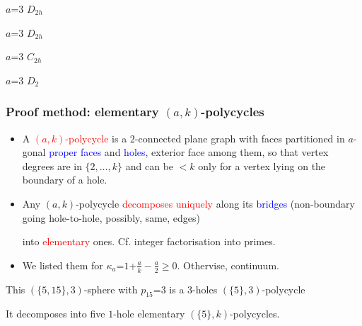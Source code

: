 \documentclass{beamer}
\begin{document}
\begin{frame}
\begin{center}
\begin{minipage}[b]{17mm}
\centering
{}\par
$a$=$3$ $D_{2h}$
\end{minipage}
\begin{minipage}[b]{17mm}
\centering
{}\par
$a$=$3$ $D_{2h}$
\end{minipage}  
\begin{minipage}[b]{17mm}
\centering
{}\par
$a$=$3$ $C_{2h}$
\end{minipage}
\begin{minipage}[b]{17mm}
\centering
{}\par
$a$=$3$ $D_{2}$
\end{minipage}
\end{center}
\end{frame}

\begin{frame}\frametitle{Proof method: elementary $(a,k)$-polycycles}
\vspace{-3.5mm}
\begin{itemize}
\item A \textcolor{red}{$(a,k)$-polycycle} is a
$2$-connected plane graph with faces partitioned
in  $a$-gonal
\textcolor{blue}{proper  faces} and 
\textcolor{blue}{holes}, exterior face among them, 
so that
vertex degrees are  in $\{2,\dots ,k\}$ and  can be  $<k$
only for a  vertex lying on the
boundary of a hole.
\item Any $(a,k)$-polycycle \textcolor{red}{decomposes uniquely} along 
its \textcolor{blue}{bridges} (non-boundary  going   
hole-to-hole, possibly, same, edges)

into  \textcolor{red}{elementary} ones. Cf. integer factorisation into 
primes.  
\item We listed them for $\kappa_a$=$1$+$\frac{a}{k}-\frac{a}{2}$$\ge$$0$. Othervise, 
continuum.
\end{itemize}

\begin{center}
\begin{minipage}[b]{20mm}
\centering
{}\par
\end{minipage}
\end{center} 
This $(\{5,15\},3)$-sphere with $p_{15}$=$3$ 
is a $3$-holes $(\{5\},3)$-polycycle 

It decomposes into five
$1$-hole elementary $(\{5\},k)$-polycycles.

\end{frame} 
\end{document}
